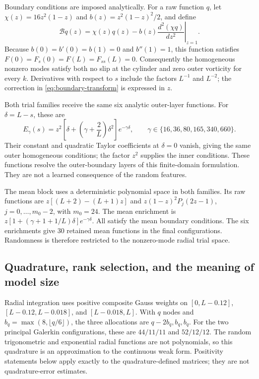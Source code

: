 Boundary conditions are imposed analytically. For a raw function
\(q\), let \(\chi(z)=16z^2(1-z)\) and
\(b(z)=z^2(1-z)^2/2\), and define
\begin{equation}
 \mathcal Bq(z)=\chi(z)q(z)
       -b(z)\left.\frac{d^2(\chi q)}{dz^2}\right|_{z=1}.
 \label{eq:boundary-transform}
\end{equation}
Because \(b(0)=b'(0)=b(1)=0\) and \(b''(1)=1\), this function
satisfies \(F(0)=F_s(0)=F(L)=F_{ss}(L)=0\). Consequently the
homogeneous nonzero modes satisfy both no slip at the cylinder and
zero outer vorticity for every \(k\). Derivatives with respect to
\(s\) include the factors \(L^{-1}\) and \(L^{-2}\); the
correction in \eqref{eq:boundary-transform} is expressed in \(z\).

Both trial families receive the same six analytic outer-layer
functions. For \(\delta=L-s\), these are
\begin{equation}
 E_\gamma(s)=z^2\left[\delta+
       \left(\gamma+\frac{2}{L}\right)\delta^2\right]
       e^{-\gamma\delta},\qquad
 \gamma\in\{16,36,80,165,340,660\}.
 \label{eq:layer-features}
\end{equation}
Their constant and quadratic Taylor coefficients at \(\delta=0\)
vanish, giving the same outer homogeneous conditions; the factor
\(z^2\) supplies the inner conditions. These functions resolve the
outer-boundary layers of this finite-domain formulation. They are not
a learned consequence of the random features.

The mean block uses a deterministic polynomial space in both families.
Its raw functions are
\(z[(L+2)-(L+1)z]\) and
\(z(1-z)^2P_j(2z-1)\), \(j=0,\ldots,m_0-2\), with \(m_0=24\).
The mean enrichment is
\(z[1+(\gamma+1+1/L)\delta]e^{-\gamma\delta}\).
All satisfy the mean boundary conditions. The six enrichments give
30 retained mean functions in the final configurations. Randomness is
therefore restricted to the nonzero-mode radial trial space.

\subsection{Quadrature, rank selection, and the meaning of model size}

Radial integration uses positive composite Gauss weights on
\([0,L-0.12]\), \([L-0.12,L-0.018]\), and \([L-0.018,L]\).
With \(q\) nodes and \(b_q=\max(8,\lfloor q/6\rfloor)\), the
three allocations are \(q-2b_q,b_q,b_q\). For the two principal
Galerkin configurations, these are \(44/11/11\) and \(52/12/12\).
The random trigonometric and exponential radial functions are not
polynomials, so this quadrature is an approximation to the continuous
weak form. Positivity statements below apply exactly to the
quadrature-defined matrices; they are not quadrature-error estimates.

